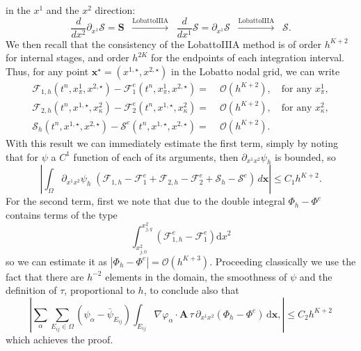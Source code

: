 \documentclass[a4paper,10pt]{article}
\begin{document}
in the $x^1$  and the $x^2$ direction:
$$
\dfrac{d}{dx^2}\partial_{x^1}\mathcal{S} = \mathbf{S} \;\; \overset{\text{LobattoIIIA}}{\longrightarrow}    \;\;  \dfrac{d}{dx^1} \mathcal{S}  =  \partial_{x^1}\mathcal{S}    \;\; \overset{\text{LobattoIIIA}}{\longrightarrow}    \;\;  \mathcal{S}.
$$
We then recall that the consistency of the LobattoIIIA method is   of order $h^{K+2}$ for internal stages, and order $h^{2K}$ for the endpoints of each integration interval. 
Thus,  for any point $\mathbf{x}^\star = (x^{1,\star},x^{2,\star})$ in the Lobatto nodal grid,
 we can write 
$$
\begin{aligned}
\mathcal{F}_{1,h}(t^n,x^1_{\pi}, x^{2,\star}) -\mathcal{F}_{1}^e(t^n,x^{1}_{\pi}, x^{2,\star}) = &\; \mathcal{O}(h^{K+2}),\quad\text{for any }x^{1}_{\pi},\\
\mathcal{F}_{2,h}(t^n,x^{1,\star},x^2_{\kappa}) -\mathcal{F}_{2}^e(t^n, x^{1,\star}, x^{2}_{\kappa}) =  &\; \mathcal{O}(h^{K+2}),\quad\text{for any }x^{2}_{\kappa},\\
\mathcal{S}_{h}(t^n,x^{1,\star},x^{2,\star}) -\mathcal{S}^e(t^n,x^{1,\star}  , x^{2,\star})  =  &\; \mathcal{O}(h^{K+2}).
\end{aligned}
$$
With this result we can immediately estimate the first term, simply by  noting that for $\psi$ a $C^1$ function of each of its arguments, then  $\partial_{x^1x^2}\psi_h$ is bounded, so 
$$
\left\lvert \int_{\Omega}\partial_{x^1x^2}\psi_{h}  \;( \mathcal{F}_{1,h}  -\mathcal{F}_{1}^e +  \mathcal{F}_{2,h} -\mathcal{F}_{2}^e+  \mathcal{S}_{h} - \mathcal{S}^e   )\,d\mathbf{x} \right\rvert \le C_1 h^{K+2}.
$$
For the second term, first we note  that due to the double integral  $ \Phi_h -\Phi^e$   contains terms of the type
$$
\int_{x^2_{j,0} }^{x^2_{j,q} } (\mathcal{F}_{1,h}^e-\mathcal{F}_{1}^e)\mathrm{d}x^2
$$
so we can estimate it as $| \Phi_h -\Phi^e|=\mathcal{O}(h^{K+3})$.  Proceeding classically \cite{AR:17,amr2025} we use the fact that there are $h^{-2}$ elements in the domain,
the smoothness of $\psi$ and the definition of $\tau$, proportional to $h$, to conclude also that 
$$
\left\lvert  \sum_\alpha\sum_{E_{ij}\in\Omega}  (\psi_{\alpha} -\bar \psi_{E_{ij}}) \int_{E_{ij}} \nabla\varphi_\alpha\cdot \mathbf{A}\,\tau\, 
\partial_{x^1x^2}(\Phi_h - \Phi^e) \,\mathrm{d}\mathbf{x},
\right\rvert \le C_2 h^{K+2}
$$
which achieves the proof.



	
\end{document}
